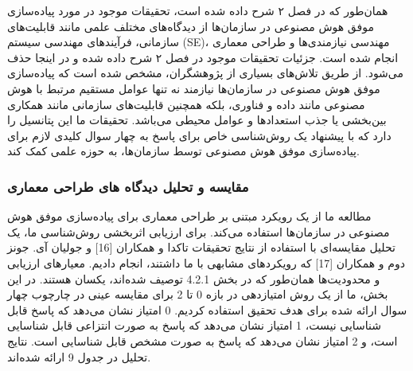 \documentclass[a4paper,10pt]{article}
\begin{document}
                    همان‌طور که در فصل ۲ شرح داده شده است، تحقیقات موجود در مورد پیاده‌سازی موفق هوش مصنوعی در سازمان‌ها از دیدگاه‌های مختلف علمی مانند قابلیت‌های سازمانی، فرآیندهای مهندسی سیستم (SE)، مهندسی نیازمندی‌ها و طراحی معماری انجام شده است. جزئیات تحقیقات موجود در فصل ۲ شرح داده شده و در اینجا حذف می‌شود. از طریق تلاش‌های بسیاری از پژوهشگران، مشخص شده است که پیاده‌سازی موفق هوش مصنوعی در سازمان‌ها نیازمند نه تنها عوامل مستقیم مرتبط با هوش مصنوعی مانند داده و فناوری، بلکه همچنین قابلیت‌های سازمانی مانند همکاری بین‌بخشی یا جذب استعدادها و عوامل محیطی می‌باشد. تحقیقات ما این پتانسیل را دارد که با پیشنهاد یک روش‌شناسی خاص برای پاسخ به چهار سوال کلیدی لازم برای پیاده‌سازی موفق هوش مصنوعی توسط سازمان‌ها، به حوزه علمی کمک کند.

                \subsubsection{مقایسه و تحلیل دیدگاه های طراحی معماری}

                    مطالعه ما از یک رویکرد مبتنی بر طراحی معماری برای پیاده‌سازی موفق هوش مصنوعی در سازمان‌ها استفاده می‌کند. برای ارزیابی اثربخشی روش‌شناسی ما، یک تحلیل مقایسه‌ای با استفاده از نتایج تحقیقات تاکدا و همکاران [16] و جولیان آی. جونز دوم و همکاران [17] که رویکردهای مشابهی با ما داشتند، انجام دادیم. معیارهای ارزیابی و محدودیت‌ها همان‌طور که در بخش 4.2.1 توصیف شده‌اند، یکسان هستند. در این بخش، ما از یک روش امتیازدهی در بازه 0 تا 2 برای مقایسه عینی در چارچوب چهار سوال ارائه شده برای هدف تحقیق استفاده کردیم. 0 امتیاز نشان می‌دهد که پاسخ قابل شناسایی نیست، 1 امتیاز نشان می‌دهد که پاسخ به صورت انتزاعی قابل شناسایی است، و 2 امتیاز نشان می‌دهد که پاسخ به صورت مشخص قابل شناسایی است. نتایج تحلیل در جدول 9 ارائه شده‌اند.

                    
\end{document}
